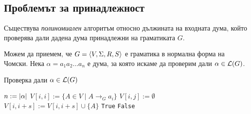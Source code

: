 \subsection{Проблемът за принадлежност}

\begin{thm}
  Съществува {\em полиномиален} алгоритъм относно дължината на входната дума, който проверява дали дадена дума принадлежни на граматиката $G$.
\end{thm}
Можем да приемем, че $G = \langle{V,\Sigma,R,S}\rangle$ е граматика в нормална форма на Чомски.
Нека $\alpha = a_1a_2\dots a_n$ е дума, за която искаме да проверим дали $\alpha \in \mathcal{L}(G)$.
\begin{algorithm}[H]
  \caption{Проверка дали $\alpha \in \mathcal{L}(G)$}
  \label{alg:belongs-to-grammar}
  \begin{algorithmic}[1]
    \State $n := \vert{\alpha}\vert$ 
    \State $V[i,i] := \{A \in V \mid A\to_G a_i\}$
    \EndFor
    \State $V[i,j] := \emptyset$
    \EndFor      
    \ForAll{$s \in [1, n)$} 
    \ForAll{$k \in [i, i + s)$}
    \State $V[i,i+s] := V[i,i+s] \cup \{A\}$
    \EndIf
    \EndFor
    \EndFor
    \EndFor
    \State \Return \texttt{True}
    \Else
    \State \Return \texttt{False}
    \EndIf
  \end{algorithmic}
\end{algorithm}

